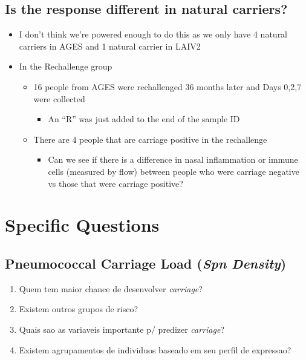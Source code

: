 \documentclass[
]{book}
\providecommand{\tightlist}{%
  \setlength{\itemsep}{0pt}\setlength{\parskip}{0pt}}
\begin{document}
\hypertarget{is-the-response-different-in-natural-carriers}{%
\subsection{Is the response different in natural carriers?}\label{is-the-response-different-in-natural-carriers}}

\begin{itemize}
\item
  I don't think we're powered enough to do this as we only have 4 natural carriers in AGES and 1 natural carrier in LAIV2
\item
  In the Rechallenge group

  \begin{itemize}
  \item
    16 people from AGES were rechallenged 36 months later and Days 0,2,7 were collected

    \begin{itemize}
    \tightlist
    \item
      An ``R'' was just added to the end of the sample ID
    \end{itemize}
  \item
    There are 4 people that are carriage positive in the rechallenge

    \begin{itemize}
    \tightlist
    \item
      Can we see if there is a difference in nasal inflammation or immune cells (measured by flow) between people who were carriage negative vs those that were carriage positive?
    \end{itemize}
  \end{itemize}
\end{itemize}

\hypertarget{specific-questions}{%
\section{Specific Questions}\label{specific-questions}}

\hypertarget{pneumococcal-carriage-load-spn-density}{%
\subsection{\texorpdfstring{Pneumococcal Carriage Load (\emph{Spn Density})}{Pneumococcal Carriage Load (Spn Density)}}\label{pneumococcal-carriage-load-spn-density}}

\begin{enumerate}
\def\labelenumi{\arabic{enumi}.}
\tightlist
\item
  Quem tem maior chance de desenvolver \emph{carriage}?
\item
  Existem outros grupos de risco?
\item
  Quais sao as variaveis importante p/ predizer \emph{carriage}?
\item
  Existem agrupamentos de individuos baseado em seu perfil de expressao?
\end{enumerate}
\end{document}
